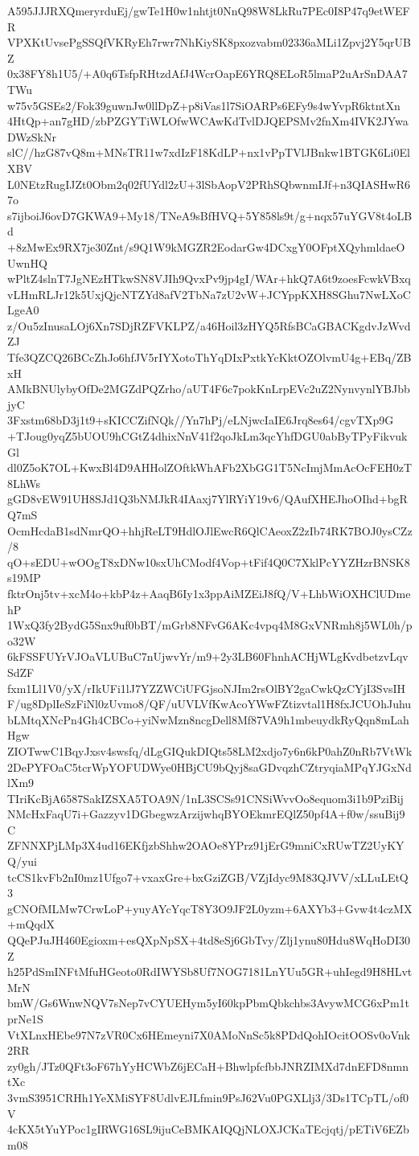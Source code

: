 A595JJJRXQmeryrduEj/gwTe1H0w1nhtjt0NnQ98W8LkRu7PEc0I8P47q9etWEFR
VPXKtUvsePgSSQfVKRyEh7rwr7NhKiySK8pxozvabm02336aMLi1Zpvj2Y5qrUBZ
0x38FY8h1U5/+A0q6TsfpRHtzdAfJ4WcrOapE6YRQ8ELoR5lmaP2uArSnDAA7TWu
w75v5GSEs2/Fok39guwnJw0llDpZ+p8iVas1l7SiOARPs6EFy9s4wYvpR6ktntXn
4HtQp+an7gHD/zbPZGYTiWLOfwWCAwKdTvlDJQEPSMv2fnXm4IVK2JYwaDWzSkNr
slC//hzG87vQ8m+MNsTR11w7xdIzF18KdLP+nx1vPpTVlJBnkw1BTGK6Li0ElXBV
L0NEtzRugIJZt0Obm2q02fUYdl2zU+3lSbAopV2PRhSQbwnmIJf+n3QIASHwR67o
s7ijboiJ6ovD7GKWA9+My18/TNeA9sBfHVQ+5Y858ls9t/g+nqx57uYGV8t4oLBd
+8zMwEx9RX7je30Znt/s9Q1W9kMGZR2EodarGw4DCxgY0OFptXQyhmldaeOUwnHQ
wPltZ4slnT7JgNEzHTkwSN8VJIh9QvxPv9jp4gI/WAr+hkQ7A6t9zoesFcwkVBxq
vLHmRLJr12k5UxjQjcNTZYd8afV2TbNa7zU2vW+JCYppKXH8SGhu7NwLXoCLgeA0
z/Ou5zInusaLOj6Xn7SDjRZFVKLPZ/a46Hoil3zHYQ5RfsBCaGBACKgdvJzWvdZJ
Tfe3QZCQ26BCcZhJo6hfJV5rIYXotoThYqDIxPxtkYcKktOZOlvmU4g+EBq/ZBxH
AMkBNUlybyOfDe2MGZdPQZrho/aUT4F6c7pokKnLrpEVc2uZ2NynvynlYBJbbjyC
3Fxstm68bD3j1t9+sKICCZifNQk//Yn7hPj/eLNjwcIaIE6Jrq8es64/cgvTXp9G
+TJoug0yqZ5bUOU9hCGtZ4dhixNnV41f2qoJkLm3qcYhfDGU0abByTPyFikvukGl
dl0Z5oK7OL+KwxBl4D9AHHolZOftkWhAFb2XbGG1T5NcImjMmAcOcFEH0zT8LhWs
gGD8vEW91UH8SJd1Q3bNMJkR4IAaxj7YlRYiY19v6/QAufXHEJhoOIhd+bgRQ7mS
OcmHcdaB1sdNmrQO+hhjReLT9HdlOJlEwcR6QlCAeoxZ2zIb74RK7BOJ0ysCZz/8
qO+sEDU+wOOgT8xDNw10sxUhCModf4Vop+tFif4Q0C7XklPcYYZHzrBNSK8s19MP
fktrOnj5tv+xcM4o+kbP4z+AaqB6Iy1x3ppAiMZEiJ8fQ/V+LhbWiOXHClUDmehP
1WxQ3fy2BydG5Snx9uf0bBT/mGrb8NFvG6AKc4vpq4M8GxVNRmh8j5WL0h/po32W
6kFSSFUYrVJOaVLUBuC7nUjwvYr/m9+2y3LB60FhnhACHjWLgKvdbetzvLqvSdZF
fxm1Ll1V0/yX/rIkUFi1lJ7YZZWCiUFGjsoNJIm2rsOlBY2gaCwkQzCYjI3SvsIH
F/ug8DplIeSzFiNl0zUvmo8/QF/uUVLVfKwAcoYWwFZtizvtal1H8fxJCUOhJuhu
bLMtqXNcPn4Gh4CBCo+yiNwMzn8ncgDell8Mf87VA9h1mbeuydkRyQqn8mLahHgw
ZIOTwwC1BqyJxsv4swsfq/dLgGIQukDIQts58LM2xdjo7y6n6kP0ahZ0nRb7VtWk
2DePYFOaC5tcrWpYOFUDWye0HBjCU9bQyj8saGDvqzhCZtryqiaMPqYJGxNdlXm9
TIriKcBjA6587SakIZSXA5TOA9N/1nL3SCSs91CNSiWvvOo8equom3i1b9PziBij
NMcHxFaqU7i+Gazzyv1DGbegwzArzijwhqBYOEkmrEQlZ50pf4A+f0w/ssuBij9C
ZFNNXPjLMp3X4ud16EKfjzbShhw2OAOe8YPrz91jErG9mniCxRUwTZ2UyKYQ/yui
tcCS1kvFb2nI0mz1Ufgo7+vxaxGre+bxGziZGB/VZjIdyc9M83QJVV/xLLuLEtQ3
gCNOfMLMw7CrwLoP+yuyAYcYqcT8Y3O9JF2L0yzm+6AXYb3+Gvw4t4czMX+mQqdX
QQePJuJH460Egioxm+esQXpNpSX+4td8eSj6GbTvy/Zlj1ynu80Hdu8WqHoDI30Z
h25PdSmINFtMfuHGeoto0RdIWYSb8Uf7NOG7181LnYUu5GR+uhIegd9H8HLvtMrN
bmW/Gs6WnwNQV7sNep7vCYUEHym5yI60kpPbmQbkchbs3AvywMCG6xPm1tprNe1S
VtXLnxHEbe97N7zVR0Cx6HEmeyni7X0AMoNnSc5k8PDdQohIOcitOOSv0oVnk2RR
zy0gh/JTz0QFt3oF67hYyHCWbZ6jECaH+BhwlpfcfbbJNRZIMXd7dnEFD8nmntXc
3vmS3951CRHh1YeXMiSYF8UdlvEJLfmin9PsJ62Vu0PGXLlj3/3Ds1TCpTL/of0V
4cKX5tYuYPoc1gIRWG16SL9ijuCeBMKAIQQjNLOXJCKaTEcjqtj/pETiV6EZbm08
